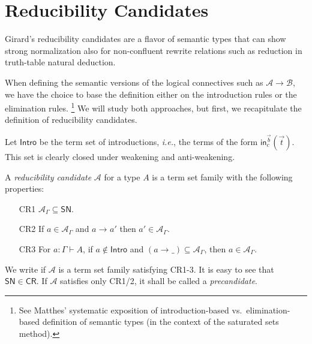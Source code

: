 \documentclass[a4paper,USenglish,cleveref, autoref, thm-restate]{lipics-v2019}
\makeatletter
\def\namedlabel#1#2{\begingroup
    #2%
    \def\@currentlabel{#2}%
    \phantomsection\label{#1}\endgroup
}
\newcommand{\ie}{\emph{i.e.}\xspace}
\newcommand{\tin}{\ensuremath{\mathsf{in}}}
\newcommand{\red}[1][]{\longrightarrow_{#1}}
\newcommand{\CR}{\mathsf{CR}}
\newcommand{\A}{\mathcal{A}}
\newcommand{\B}{\mathcal{B}}
\newcommand{\SN}{\mathsf{SN}}
\newcommand{\Intro}{\mathsf{Intro}}
\newcommand{\indy}[1]{_{#1}}
\makeatother
\begin{document}
\section{Reducibility Candidates}
\label{sec:cr}

Girard's reducibility candidates are a flavor of semantic types that
can show strong normalization also for non-confluent rewrite relations
such as reduction in truth-table natural deduction.

When defining the semantic versions of the logical connectives such as
$\A \to \B$, we have the choice to base the definition either on the
introduction rules or the elimination rules.%
\footnote{See Matthes' \cite[Section 6.2]{matthes:intersection}
  systematic exposition of introduction-based vs.\ elimination-based
  definition of semantic types (in the context of the saturated sets method).}
We will study both
approaches, but first, we recapitulate the definition of reducibility
candidates.

Let $\Intro$ be the term set of introductions, \ie, the terms of
the form $\tin^{\vec b}_c(\vec t)$.  This set is clearly closed under
weakening and anti-weakening.

A \emph{reducibility candidate} $\A$ for a type $A$
is a term set family
with the following properties:
\begin{itemize}%
\setlength{\itemindent}{2.7em}


\item[\namedlabel{it:cr1}{CR1}]
  $\A\indy\Gamma \subseteq \SN$.

\item[\namedlabel{it:cr2}{CR2}]
  If $a \in \A\indy\Gamma$ and $a \red a'$ then $a' \in \A\indy\Gamma$.

\item[\namedlabel{it:cr3}{CR3}]
  For $a : \Gamma \vdash A$,
  if $a \not\in \Intro$
  and $(a \red \_) \subseteq \A\indy\Gamma$, then $a \in \A\indy\Gamma$.

\end{itemize}
We write \fbox{$\A \in \CR$} if $\A$ is a term set family satisfying CR1-3.
It is easy to see that $\SN \in \CR$.
If $\A$ satisfies only CR1/2, it shall be called a \emph{precandidate}.
\end{document}
